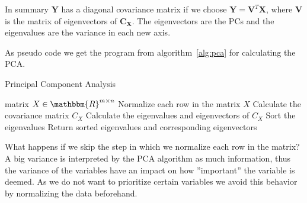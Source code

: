In summary $\mathbf{Y}$ has a diagonal covariance matrix if we choose $\mathbf{Y} = \mathbf{V}^T\mathbf{X}$, where $\mathbf{V}$ is the matrix of eigenvectors of $\mathbf{C}_\mathbf{X}$. The eigenvectors are the PCs and the eigenvalues are the variance in each new axis.

As pseudo code we get the program from algorithm~\ref{alg:pca} for calculating the PCA.

\begin{algorithm}
	\caption{Principal Component Analysis}\label{alg:pca}
	\begin{algorithmic}
		\Require matrix $X \in \mathbbm{R}^{m\times n}$
		\State Normalize each row in the matrix $X$
		\State Calculate the covariance matrix $C_{X}$
		\State Calculate the eigenvalues and eigenvectors of $C_{X}$
		\State Sort the eigenvalues
		\State Return sorted eigenvalues and corresponding eigenvectors
	\end{algorithmic}
\end{algorithm}

What happens if we skip the step in which we normalize each row in the matrix? A big variance is interpreted by the PCA algorithm as much information, thus the variance of the variables have an impact on how ''important'' the variable is deemed. As we do not want to prioritize certain variables we avoid this behavior by normalizing the data beforehand.